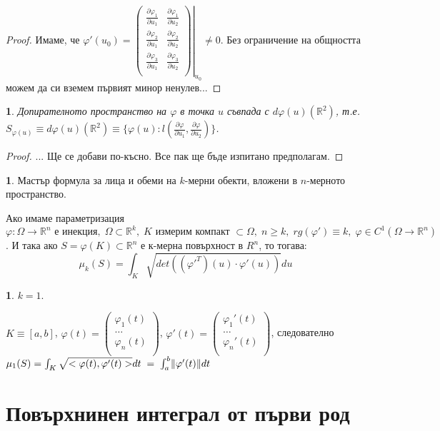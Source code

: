 \documentclass[11pt]{article}
\numberwithin{equation}{section}
\numberwithin{figure}{section}
\numberwithin{table}{section}
\theoremstyle{plain}
\theoremstyle{definition}
\newtheorem{defn}[thm]{\protect\definitionname}
\theoremstyle{remark}
\theoremstyle{definition}
\theoremstyle{remark}
\theoremstyle{plain}
\theoremstyle{definition}
\theoremstyle{definition}
\newtheorem{example}[thm]{\protect\examplename}
\theoremstyle{plain}
\theoremstyle{plain}
\newtheorem{prop}[thm]{\protect\propositionname}
\theoremstyle{plain}
\theoremstyle{definition}
\theoremstyle{plain}
\providecommand{\definitionname}{Дефиниция}
\providecommand{\examplename}{Пример}
\providecommand{\propositionname}{Твърдение}
\DeclarePairedDelimiter\norm{\lVert}{\rVert}
\newcommand*{\R}{\mathbb{R}}
\newcommand*{\p}{\partial}
\begin{document}
\begin{proof}
Имаме, че $\varphi '(u_0) = \left. \begin{pmatrix}
	\frac{\p\varphi_1}{\p u_1} & \frac{\p\varphi_1}{\p u_2}\\
	\frac{\p\varphi_2}{\p u_1} & \frac{\p\varphi_2}{\p u_2}\\
	\frac{\p\varphi_3}{\p u_1} & \frac{\p\varphi_3}{\p u_2}\\
\end{pmatrix} \right|_{u_0} \neq 0$. Без ограничение на общността можем да си вземем първият минор ненулев...
\end{proof}

\begin{prop}
Допирателното пространство на $\varphi$ в точка $u$ съвпада с $d\varphi(u)(\R^2)$, т.е. $S_{\varphi(u)}\equiv d\varphi(u)(\R^2) \equiv \{\varphi(u):l(\frac{\p\varphi}{\p u_1}, \frac{\p\varphi}{\p u_2})\}$.
\end{prop}

\begin{proof}
... Ще се добави по-късно. Все пак ще бъде изпитано предполагам.
\end{proof}

\begin{defn}Мастър формула за лица и обеми на $k$-мерни обекти, вложени в $n$-мерното пространство.

Ако имаме параметризация $\varphi:\Omega\rightarrow\R^n \text{ е инекция}, \; \Omega \subset \R^k, \; K \text{ измерим компакт }\subset \Omega, \; n\geq k, \; rg(\varphi')\equiv k, \; \varphi\in C^1(\Omega\rightarrow\R^n)$. И така ако $S = \varphi(K)\subset\R^n$ е к-мерна повърхност в $R^n$, то тогава:
$$\mu_k(S) = \int_K \sqrt{det\left(({\varphi'}^T)(u)\cdot\varphi'(u)\right)}du$$
\end{defn}

\begin{example} $k=1$.

$K\equiv [a,b]$, $\varphi(t) = \begin{pmatrix}
	\varphi_1(t)\\
	\dots\\
	\varphi_n(t)\\
\end{pmatrix}$, $\varphi'(t) = \begin{pmatrix}
	\varphi_1'(t)\\
	\dots\\
	\varphi_n'(t)\\
\end{pmatrix}$, следователно $\mu_1(S) = \int_K \sqrt{<\varphi(t),\varphi'(t)>}dt \; = \; \int_a^b \norm{\varphi'(t)}dt$
\end{example}

\section{Повърхнинен интеграл от първи род}
\end{document}
